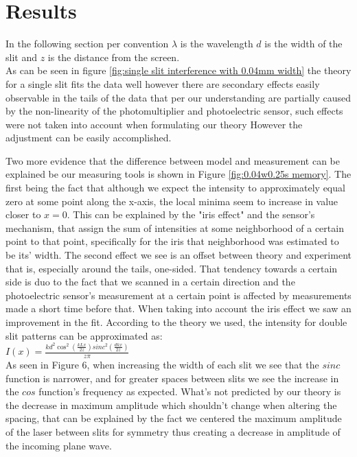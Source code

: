 \section{Results}
In the following section per convention $\lambda$ is the wavelength $d$ is the width of the slit and $z$ is the distance from the screen.\\
As can be seen in figure \ref{fig:single slit interference with 0.04mm width} the theory for a single slit fits the data well however there are
secondary effects easily observable in the tails of the data that per our understanding are partially caused by the non-linearity of the
photomultiplier and photoelectric sensor, such effects were not taken into account when formulating our theory
However the adjustment can be easily accomplished.



Two more evidence that the difference between model and measurement can be explained be our measuring tools is shown in Figure {\ref{fig:0.04w0.25s memory}}.
The first being the fact that although we expect the intensity to approximately equal zero at some point along the x-axis, the local minima seem to increase in value closer to $x=0$.
This can be explained by the "iris effect" and the sensor's mechanism, that assign the sum of intensities at some neighborhood of a certain point to that point, specifically for the iris that neighborhood was estimated to be its' width.
The second effect we see is an offset between theory and experiment that is, especially around the tails, one-sided.
That tendency towards a certain side is duo to the fact that we scanned in a certain direction and the photoelectric sensor's measurement at a certain point is affected by measurements made a short time before that.
When taking into account the iris effect we saw an improvement in the fit.
According to the theory we used, the intensity for double slit patterns can be approximated as:\\
$I(x)=\frac{kd^2\cos^2(\frac{kLx}{2z})sinc^2(\frac{dkx}{2z})}{z\pi}$\\
As seen in Figure 6, when increasing the width of each slit we see that the $sinc$ function is narrower, and for greater spaces between slits we see the increase in the $cos$ function's frequency as expected.
What's not predicted by our theory is the decrease in maximum amplitude which shouldn't change when altering the spacing,
that can be explained by the fact we centered the maximum amplitude of the laser between slits for symmetry thus creating a decrease in amplitude of the incoming plane wave.
